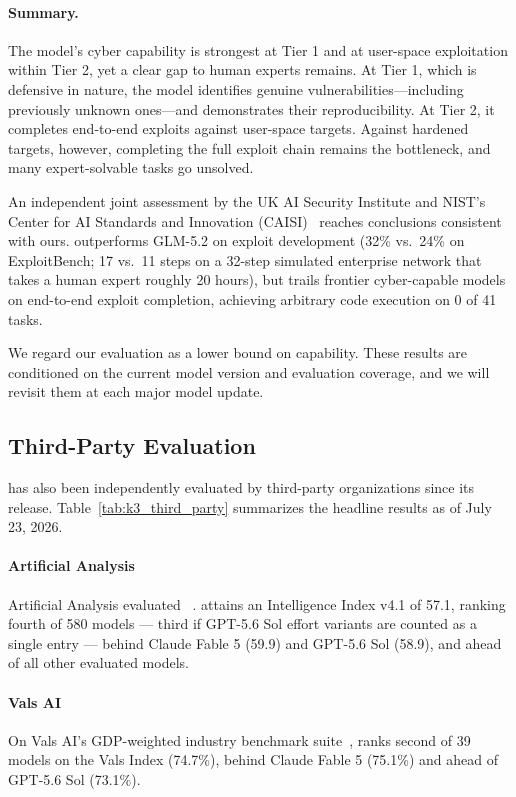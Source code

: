 \paragraph{Summary.}
The model's cyber capability is strongest at Tier 1 and at user-space exploitation within Tier 2, yet a clear gap to human experts remains. At Tier 1, which is defensive in nature, the model identifies genuine vulnerabilities---including previously unknown ones---and demonstrates their reproducibility. At Tier 2, it completes end-to-end exploits against user-space targets. Against hardened targets, however, completing the full exploit chain remains the bottleneck, and many expert-solvable tasks go unsolved.

An independent joint assessment by the UK AI Security Institute and NIST's Center for AI Standards and Innovation (CAISI)~\citep{ukaisi_caisi_k3} reaches conclusions consistent with ours.  outperforms GLM-5.2 on exploit development (32\% vs.\ 24\% on ExploitBench; 17 vs.\ 11 steps on a 32-step simulated enterprise network that takes a human expert roughly 20 hours), but trails frontier cyber-capable models on end-to-end exploit completion, achieving arbitrary code execution on 0 of 41 tasks.

We regard our evaluation as a lower bound on capability. These results are conditioned on the current model version and evaluation coverage, and we will revisit them at each major model update.






\subsection{Third-Party Evaluation}
\label{sec:eval_third_party}
 has also been independently evaluated by third-party organizations since its release. Table~\ref{tab:k3_third_party} summarizes the headline results as of July 23, 2026.

\paragraph{Artificial Analysis} Artificial Analysis evaluated ~\citep{artificialanalysis}.  attains an Intelligence Index v4.1 of 57.1, ranking fourth of 580 models --- third if GPT-5.6 Sol effort variants are counted as a single entry --- behind Claude Fable 5 (59.9) and GPT-5.6 Sol (58.9), and ahead of all other evaluated models.

\paragraph{Vals AI} On Vals AI's GDP-weighted industry benchmark suite~\citep{valsai},  ranks second of 39 models on the Vals Index (74.7\%), behind Claude Fable 5 (75.1\%) and ahead of GPT-5.6 Sol (73.1\%).

